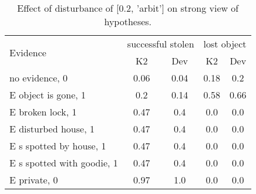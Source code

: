 \begin{table}\begin{tabular}{l|cc|cc}\toprule\multirow{2}{*}{Evidence} & \multicolumn{2}{c}{successful stolen}& \multicolumn{2}{c}{lost object}\\& {K2} & {Dev}& {K2} & {Dev}\\\midrule
no evidence, 0 & 0.06&0.04&0.18&0.2\\E object is gone, 1 & \cellcolor{Bittersweet}0.2&\cellcolor{Bittersweet}0.14&\cellcolor{Bittersweet}0.58&\cellcolor{Bittersweet}0.66\\E broken lock, 1 & \cellcolor{Bittersweet}0.47&\cellcolor{Bittersweet}0.4&0.0&0.0\\E disturbed house, 1 & \cellcolor{Bittersweet}0.47&\cellcolor{Bittersweet}0.4&0.0&0.0\\E s spotted by house, 1 & \cellcolor{Bittersweet}0.47&\cellcolor{Bittersweet}0.4&0.0&0.0\\E s spotted with goodie, 1 & \cellcolor{Bittersweet}0.47&\cellcolor{Bittersweet}0.4&0.0&0.0\\E private, 0 & 0.97&1.0&0.0&0.0\\\bottomrule\end{tabular}\caption{Effect of disturbance of [0.2, 'arbit'] on strong view of hypotheses.}\end{table}